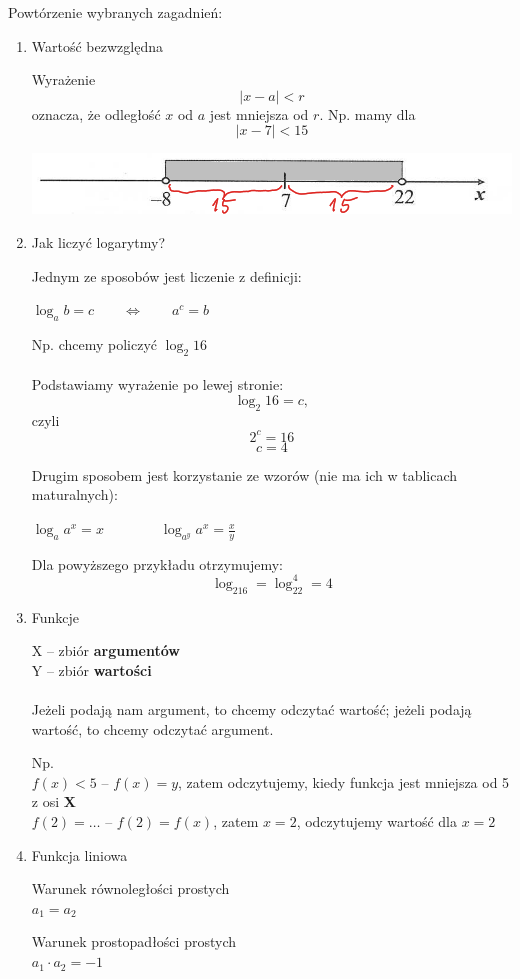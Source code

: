 \documentclass[12pt,a4paper]{article}
\theoremstyle{break}
\newcommand{\Wzor}[1]{
		\begin{mdframed}[style=wzor]
			\centering #1
		\end{mdframed}
	}
\begin{document}
{\Large Powtórzenie wybranych zagadnień:}
\begin{enumerate}[1)]
	\item {\large Wartość bezwzględna}
	
	Wyrażenie $$|x-a|<r$$ oznacza, że odległość $x$ od $a$ jest mniejsza od $r$. Np. mamy dla $$|x-7| < 15$$ 
	
	\includegraphics{r1.png}
	
	\item {\large Jak liczyć logarytmy?}
	
	Jednym ze sposobów jest liczenie z definicji:
	\Wzor{$\log_ab=c \qquad \Leftrightarrow \qquad a^c=b$}
	Np. chcemy policzyć $\log_2 16$
	\\\\
	Podstawiamy wyrażenie po lewej stronie: $$\log_2 16 = c,$$ czyli $$2^c=16$$
	$$c=4$$
	
	Drugim sposobem jest korzystanie ze wzorów (nie ma ich w tablicach maturalnych):
	
	\Wzor{$\log_aa^x=x \qquad \qquad \log_{a^y}a^x=\frac{x}{y}$}
	Dla powyższego przykładu otrzymujemy:
	$$\log_216=\log_22^4=4$$
	
	\item {\large Funkcje}
	
	X – zbiór \textbf{argumentów} \\
	Y – zbiór \textbf{wartości}
	\\\\
	Jeżeli podają nam argument, to chcemy odczytać wartość; jeżeli podają wartość, to chcemy odczytać argument.
	
	Np.\\ $f(x)<5$ – $f(x)=y$, zatem odczytujemy, kiedy funkcja jest mniejsza od 5 z osi \textbf{X} \\
	$f(2)=\dots$ – $f(2)=f(x)$, zatem $x=2$, odczytujemy wartość dla $x=2$
	\newpage
	\item {\large Funkcja liniowa}
	
	\Wzor{Warunek równoległości prostych\\
		$a_1=a_2$}
	\Wzor{Warunek prostopadłości prostych\\
		$a_1\cdot a_2=-1$}
	

\end{enumerate}
\end{document}
